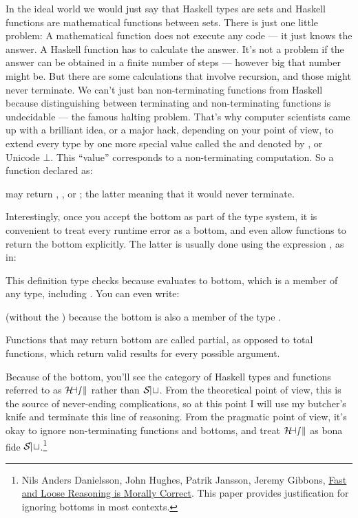 In the ideal world we would just say that Haskell types are sets and
Haskell functions are mathematical functions between sets. There is just
one little problem: A mathematical function does not execute any code
--- it just knows the answer. A Haskell function has to calculate the
answer. It's not a problem if the answer can be obtained in a finite
number of steps --- however big that number might be. But there are some
calculations that involve recursion, and those might never terminate. We
can't just ban non-terminating functions from Haskell because
distinguishing between terminating and non-terminating functions is
undecidable --- the famous halting problem. That's why computer
scientists came up with a brilliant idea, or a major hack, depending on
your point of view, to extend every type by one more special value
called the  and denoted by \code{\_|\_}, or
Unicode $\bot$. This ``value'' corresponds to a non-terminating computation.
So a function declared as:

may return , , or \code{\_|\_};
the latter meaning that it would never terminate.

Interestingly, once you accept the bottom as part of the type system, it
is convenient to treat every runtime error as a bottom, and even allow
functions to return the bottom explicitly. The latter is usually done
using the expression , as in:

This definition type checks because  evaluates to
bottom, which is a member of any type, including . You can
even write:

(without the ) because the bottom is also a member of the type
.

Functions that may return bottom are called partial, as opposed to total
functions, which return valid results for every possible argument.

Because of the bottom, you'll see the category of Haskell types and
functions referred to as $\mathcal{H\mkern-3mu ask}$ rather than $\mathcal{S\mkern-3mu et}$. From
the theoretical point of view, this is the source of never-ending
complications, so at this point I will use my butcher's knife and
terminate this line of reasoning. From the pragmatic point of view, it's
okay to ignore non-terminating functions and bottoms, and treat
$\mathcal{H\mkern-3mu ask}$ as bona fide $\mathcal{S\mkern-3mu et}$.\footnote{Nils Anders Danielsson,
John Hughes, Patrik Jansson, Jeremy Gibbons, \href{http://www.cs.ox.ac.uk/jeremy.gibbons/publications/fast+loose.pdf}{
Fast and Loose Reasoning is Morally Correct}. This paper provides justification for ignoring bottoms in most contexts.}

